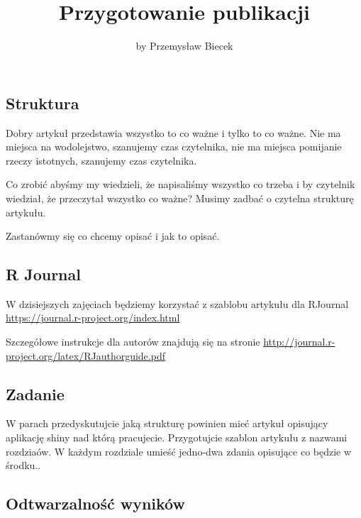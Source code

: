 \title{Przygotowanie publikacji}
\author{by Przemysław Biecek}

\maketitle


\subsection{Struktura}\label{struktura}

Dobry artykuł przedstawia wszystko to co ważne i tylko to co ważne. Nie
ma miejsca na wodolejstwo, szanujemy czas czytelnika, nie ma miejsca
pomijanie rzeczy istotnych, szanujemy czas czytelnika.

Co zrobić abyśmy my wiedzieli, że napisaliśmy wszystko co trzeba i by
czytelnik wiedział, że przeczytał wszystko co ważne? Musimy zadbać o
czytelna strukturę artykułu.

Zastanówmy się co chcemy opisać i jak to opisać.

\subsection{R Journal}\label{r-journal}

W dzisiejszych zajęciach będziemy korzystać z szablobu artykułu dla
RJournal \url{https://journal.r-project.org/index.html}

Szczegółowe instrukcje dla autorów znajdują się na stronie
\url{http://journal.r-project.org/latex/RJauthorguide.pdf}

\subsection{Zadanie}\label{zadanie}

W parach przedyskutujcie jaką strukturę powinien mieć artykuł opisujący
aplikację shiny nad którą pracujecie. Przygotujcie szablon artykułu z
nazwami rozdziaów. W każdym rozdziale umieść jedno-dwa zdania opisujące
co będzie w środku..

\subsection{Odtwarzalność wyników}\label{odtwarzalnosc-wynikow}

